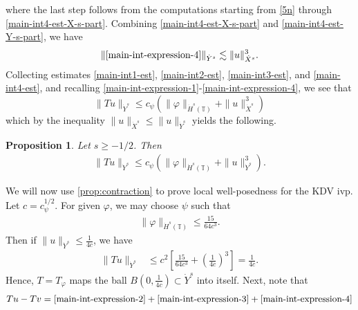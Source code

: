 \documentclass[12pt,reqno]{amsart}
\numberwithin{equation}{section}  %
\numberwithin{figure}{section}
\newcommand{\ci}{\mathbb{T}}
\newcommand{\vp}{\varphi}
\theoremstyle{plain}
\newtheorem{proposition}{Proposition}
\theoremstyle{definition}
\theoremstyle{remark}
\begin{document}
%
%
where the last step follows from the computations starting from \eqref{5n}
through \eqref{main-int4-est-X-s-part}.
Combining \eqref{main-int4-est-X-s-part} and \eqref{main-int4-est-Y-s-part}, we
have
%
%
\begin{equation}
\label{main-int4-est}
	\begin{split}
		\|\eqref{main-int-expression-4}\|_{\dot{Y}^s} \lesssim \|u\|_{\dot{X}^s}^{3}.
	\end{split}
\end{equation}
%
%
Collecting estimates \eqref{main-int1-est}, \eqref{main-int2-est}, 
\eqref{main-int3-est}, and \eqref{main-int4-est}, and recalling 
\eqref{main-int-expression-1}-\eqref{main-int-expression-4}, we see that
$$\|Tu\|_{\dot{Y}^s} \le c_\psi \left( \|\vp \|_{\dot{H}^s(\ci)} + \|u\|_{\dot{X}^s}^3 \right )$$ 
which by the inequality $\|u\|_{\dot{X}^s} \le \|u\|_{\dot{Y}^s}$ yields the following.
%
%				 
%
\begin{proposition}
\label{prop:contraction}
Let $s \ge -1/2$. Then
%
\begin{equation*}
	\begin{split}
		\|Tu\|_{\dot{Y}^s} \le c_\psi \left( \|\vp \|_{\dot{H}^s(\ci)} + \|u\|_{\dot{Y}^s}^3 
		\right).
	\end{split}
\end{equation*}
%
\end{proposition}
We will now use \autoref{prop:contraction} to prove local well-posedness for the 
KDV ivp. Let $c = c_{\psi}^{1/2}$. For given $\vp$, we may choose $\psi$ such
that 
%
\begin{equation*}
	\begin{split}
		\|\vp\|_{\dot{H}^s(\ci)} \le \frac{15}{64c^3}.
	\end{split}
\end{equation*}
%
Then if $\|u\|_{\dot{Y}^s} \le \frac{1}{4c}$, we have
%
\begin{equation*}
	\begin{split}
		\|T u \|_{\dot{Y}^s} 
		& \le c^2 \left[ \frac{15}{64c^3} + \left( 
		\frac{1}{4c} \right)^3 \right]
		=  \frac{1}{4c}.
	\end{split}
\end{equation*}
%
Hence, $T=T_{\vp}$ maps the ball $B\left( 0, \frac{1}{4c} \right) \subset \dot{Y}^s$ into 
itself. Next, note that
%
\begin{equation*}
	\begin{split}
		Tu - Tv = \eqref{main-int-expression-2} + \eqref{main-int-expression-3} 
		+ \eqref{main-int-expression-4}
	\end{split}
\end{equation*}
\end{document}
